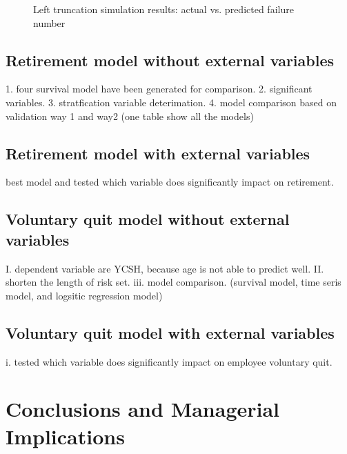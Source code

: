 \documentclass[12pt,letterpaper]{article}
\begin{document}
\begin{figure}[h!]
	\centering
	\quad
	\quad
	\quad
	\caption{Left truncation simulation results: actual vs. predicted failure number}
	\label{fig:lefttruncation}
\end{figure}




%
\subsection{Retirement model without external variables}
   1. four survival model have been generated for comparison.
   2. significant variables.
   3. stratfication variable deterimation.
   4. model comparison based on validation way 1 and way2 (one table show all the models)
\subsection{Retirement model with external variables}
     best model and tested which variable does significantly impact on retirement.
\subsection{Voluntary quit model without external variables}
     I. dependent variable are YCSH, because age is not able to predict well.
     II. shorten the length of risk set.
     iii. model comparison. (survival model, time seris model, and logsitic regression model)
\subsection{Voluntary quit model with external variables}
    i. tested which variable does significantly impact on employee voluntary quit.


\section{Conclusions and Managerial Implications} 


	
\end{document}
